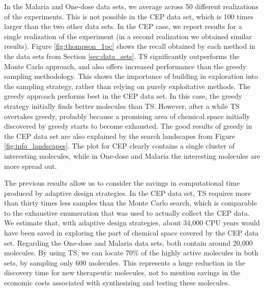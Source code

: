 In the Malaria and One-dose data sets, we average across 50 different realizations of the experiments. This is not possible in the CEP data set, which is 100 times larger than the two other data sets. In the CEP case, we report results for a single realization of the experiment (in a second realization we obtained similar results). 
Figure \ref{fig:thompson_1pc} shows the recall obtained by each method in the data sets from 
Section \ref{sec:data_sets}. TS significantly outperforms the Monte Carlo approach, and also offers increased performance than the greedy sampling methodology. This shows the importance of building in exploration into the sampling strategy, rather than relying on purely exploitative methods. The greedy approach performs best in the CEP data set. In this case, the greedy strategy initially finds better molecules than TS. However, after a while TS overtakes greedy, probably because a promising area of chemical space 
initially discovered by greedy starts to become exhausted. The good results of greedy in the CEP data set are also explained by the search landscapes from Figure \ref{fig:info_landscapes}. The plot for CEP clearly contains a single cluster of interesting molecules, while in One-dose and Malaria the interesting molecules are more spread out.

The previous results allow us to consider the savings in computational time produced by adaptive design strategies. In the CEP data set, TS requires more than thirty times less samples than the Monte Carlo search, which is comparable to the exhaustive enumeration that was used to actually collect the CEP data. We estimate that, with adaptive design strategies, about 34,000 CPU years would have been saved in exploring the part of chemical space covered by the CEP data set. Regarding the One-dose and Malaria data sets, both contain around 20,000 molecules. By using TS, we can locate 70\% of the highly active molecules in both sets, by sampling only 600 molecules. This represents a huge reduction in the discovery time for new therapeutic molecules, not to mention savings in the economic costs associated with synthesizing and testing these molecules.

